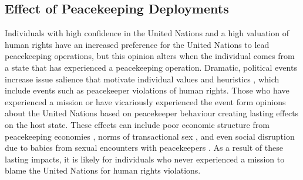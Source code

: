\documentclass[12pt]{article}
\newcommand{\UN}[1]{United Nations}
\newcommand{\PKO}[1]{peacekeeping operation}
\newcommand{\PKOs}[1]{peacekeeping operations}
\begin{document}
\subsection*{Effect of Peacekeeping Deployments}

Individuals with high confidence in the \UN{} and a high valuation of human rights have an increased preference for the \UN{} to lead \PKOs{}, but this opinion alters when the individual comes from a state that has experienced a \PKO{}. Dramatic, political events increase issue salience that motivate individual values and heuristics \citep{conover1984influence,conover1988role,hetherington2011authoritarianism}, which include events such as peacekeeper violations of human rights. Those who have experienced a mission or have vicariously experienced the event \citep{mondak2017vicarious} form opinions about the \UN{} based on peacekeeper behaviour creating lasting effects on the host state. These effects can include poor economic structure from peacekeeping economies \citep{beber2019promise}, norms of transactional sex \citep{beber2017peacekeeping}, and even social disruption due to babies from sexual encounters with peacekeepers \citep{simic2014peacekeeper}. As a result of these lasting impacts, it is likely for individuals who never experienced a mission to blame the \UN{} for human rights violations. 

\begin{table}[t!]
\renewcommand{\arraystretch}{2.0}
\renewcommand{\arraystretch}{1.0}
\caption{Expectations regarding preferences for the United Nations \label{Hs}}
\end{table}
\end{document}

